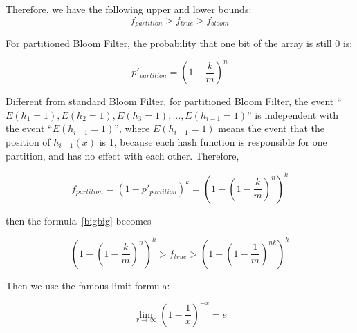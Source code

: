 
Therefore, we have the following upper and lower bounds:
\begin{equation}
\label{bigbig}
f_{partition} > f_{true} > f_{bloom}
\end{equation}



For partitioned Bloom Filter, the probability that one bit of the array is still 0 is:

\begin{equation}
p'_{partition}=\left( 1-\dfrac{k}{m} \right)^n
\end{equation}

Different from standard Bloom Filter, for partitioned Bloom Filter, the event ``$E(h_1=1),E(h_2=1),E(h_3=1),...,E(h_{i-1}=1)$'' is independent with the event ``$E(h_{i-1}=1)$'', where $E(h_{i-1}=1)$ means the event that the position of $h_{i-1}(x)$ is 1, because each hash function is responsible for one partition, and has no effect with each other. Therefore, 

\begin{equation}
f_{partition}=(1-p'_{partition})^k=\left( 1- \left( 1-\dfrac{k}{m} \right)^n \right) ^k
\end{equation}

then the formula~\ref{bigbig} becomes

\begin{equation}
\left( 1- \left( 1-\dfrac{k}{m} \right)^n \right) ^k > f_{true} > \left( 1- \left( 1-\dfrac{1}{m} \right)^{nk} \right) ^k
\end{equation}

Then we use the famous limit formula:

\begin{equation}
\lim\limits_{x \to \infty} \left( 1-\dfrac{1}{x}\right) ^{-x} = e
\end{equation}



